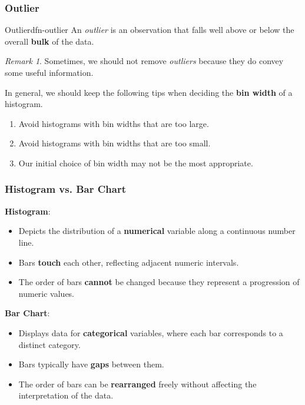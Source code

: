 \documentclass[math,code]{amznotes}
\theoremstyle{remark}
\newtheorem*{remark}{Remark}
\begin{document}
\subsubsection{Outlier}
\begin{dfnbox}{Outlier}{dfn-outlier}
    An \textit{outlier} is an observation that falls well above or below the overall \textbf{bulk} of the data.
\end{dfnbox}
\begin{notebox}
    \begin{remark}
        Sometimes, we should not remove \textit{outliers} because they do convey some useful information.
    \end{remark}
\end{notebox}
In general, we should keep the following tips when deciding the \textbf{bin width} of a histogram.
\begin{enumerate}
    \item Avoid histograms with bin widths that are too large.
    \item Avoid histograms with bin widths that are too small.
    \item Our initial choice of bin width may not be the most appropriate.
\end{enumerate}
\subsubsection{Histogram vs. Bar Chart}
\textbf{Histogram}:
\begin{itemize}
    \item Depicts the distribution of a \textbf{numerical} variable along a continuous number line.
    \item Bars \textbf{touch} each other, reflecting adjacent numeric intervals.
    \item The order of bars \textbf{cannot} be changed because they represent a progression of numeric values.
\end{itemize}
\textbf{Bar Chart}:
\begin{itemize}
    \item Displays data for \textbf{categorical} variables, where each bar corresponds to a distinct category.
    \item Bars typically have \textbf{gaps} between them.
    \item The order of bars can be \textbf{rearranged} freely without affecting the interpretation of the data.
\end{itemize}
\end{document}
